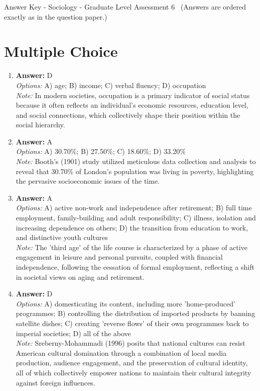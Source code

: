 \documentclass[12pt]{article}
\begin{document}
\begin{center}
Answer Key - Sociology - Graduate Level Assessment 6 \
\small (Answers are ordered exactly as in the question paper.)
\end{center}

\section*{Multiple Choice}
\begin{enumerate}[label=\arabic*.]
\item \textbf{Answer:} D
\\ \textit{Options:} A) age; B) income; C) verbal fluency; D) occupation
\\ \textit{Note:} In modern societies, occupation is a primary indicator of social status because it often reflects an individual's economic resources, education level, and social connections, which collectively shape their position within the social hierarchy.
\item \textbf{Answer:} A
\\ \textit{Options:} A) 30.70\%; B) 27.50\%; C) 18.60\%; D) 33.20\%
\\ \textit{Note:} Booth's (1901) study utilized meticulous data collection and analysis to reveal that 30.70\% of London's population was living in poverty, highlighting the pervasive socioeconomic issues of the time.
\item \textbf{Answer:} A
\\ \textit{Options:} A) active non-work and independence after retirement; B) full time employment, family-building and adult responsibility; C) illness, isolation and increasing dependence on others; D) the transition from education to work, and distinctive youth cultures
\\ \textit{Note:} The 'third age' of the life course is characterized by a phase of active engagement in leisure and personal pursuits, coupled with financial independence, following the cessation of formal employment, reflecting a shift in societal views on aging and retirement.
\item \textbf{Answer:} D
\\ \textit{Options:} A) domesticating its content, including more 'home-produced' programmes; B) controlling the distribution of imported products by banning satellite dishes; C) creating 'reverse flows' of their own programmes back to imperial societies; D) all of the above
\\ \textit{Note:} Sreberny-Mohammadi (1996) posits that national cultures can resist American cultural domination through a combination of local media production, audience engagement, and the preservation of cultural identity, all of which collectively empower nations to maintain their cultural integrity against foreign influences.

\end{enumerate}
\end{document}
